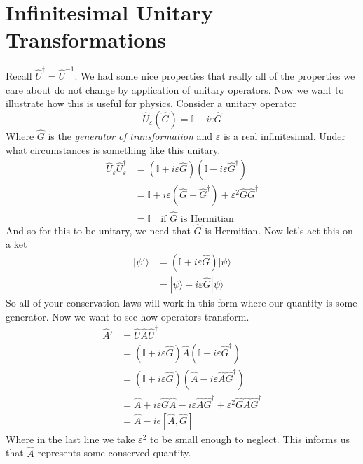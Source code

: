 \documentclass[a4paper, 11pt]{article}
\newcommand{\ket}[1]{|#1\rangle}
\begin{document}
\section{Infinitesimal Unitary Transformations} 
	\noindent Recall $\hat{U}^\dagger = \hat{U}^{-1}$. We had some nice properties that really all of the properties we care about do not change by application of unitary operators. Now we want to illustrate how this is useful for physics. Consider a unitary operator
		\begin{equation*}
			\hat{U}_\varepsilon(\hat{G}) = \mathbb{I} + i\varepsilon\hat{G}
		\end{equation*}
	Where $\hat{G}$ is the \textit{generator of transformation} and $\varepsilon$ is a real infinitesimal. Under what circumstances is something like this unitary. 
		\begin{align*}
			\hat{U}_\varepsilon\hat{U}_\varepsilon^\dagger &= (\mathbb{I}+i\varepsilon\hat{G})(\mathbb{I}-i\varepsilon\hat{G}^\dagger)\\
			&= \mathbb{I}+i\varepsilon(\hat{G}-\hat{G}^\dagger)+\varepsilon^2\hat{G}\hat{G}^\dagger\\
			&= \mathbb{I} \quad \text{if }\hat{G}\text{ is Hermitian} 
		\end{align*}
	And so for this to be unitary, we need that $\hat{G}$ is Hermitian. Now let's act this on a ket
		\begin{align*}
			\ket{\psi'} &= (\mathbb{I}+i\varepsilon\hat{G})\ket{\psi} \\ 
				&= \ket{\psi} + i\varepsilon\hat{G}\ket{\psi}
		\end{align*}
	So all of your conservation laws will work in this form where our quantity is some generator. Now we want to see how operators transform. 
		\begin{align*}
			\hat{A}' &= \hat{U}\hat{A}\hat{U}^\dagger \\
				&= (\mathbb{I}+ i\varepsilon\hat{G})\hat{A}(\mathbb{I}-i\varepsilon\hat{G}^\dagger)\\ 
				&=  (\mathbb{I}+ i\varepsilon\hat{G})(\hat{A}-i\varepsilon\hat{A}\hat{G}^\dagger)\\ 
				&= \hat{A} + i\varepsilon\hat{G}\hat{A}-i\varepsilon\hat{A}\hat{G}^\dagger + \varepsilon^2\hat{G}\hat{A}\hat{G}^\dagger \\
				&= \hat{A}-ie[\hat{A},\hat{G}]
		\end{align*}
	Where in the last line we take $\varepsilon^2$ to be small enough to neglect. This informs us that $\hat{A}$ represents some conserved quantity. 
	
\end{document}
